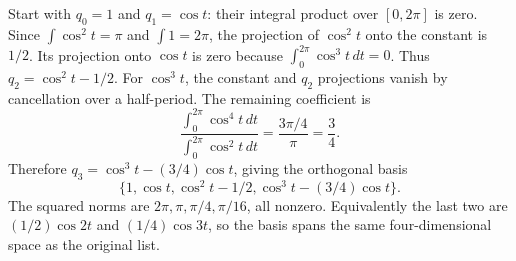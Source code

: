 Start with $q_0=1$ and $q_1=\cos t$: their integral product over
$[0,2\pi]$ is zero. Since $\int\cos^2t=\pi$ and
$\int1=2\pi$, the projection of $\cos^2t$ onto the constant
is $1/2$. Its projection onto $\cos t$ is zero because
$\int_0^{2\pi}\cos^3t\,dt=0$. Thus
$q_2=\cos^2t-1/2$.
For $\cos^3t$, the constant and $q_2$ projections vanish by
cancellation over a half-period. The remaining coefficient is
\[
 \frac{\int_0^{2\pi}\cos^4t\,dt}{\int_0^{2\pi}\cos^2t\,dt}
 =\frac{3\pi/4}{\pi}=\frac34.
\]
Therefore $q_3=\cos^3t-(3/4)\cos t$, giving the orthogonal basis
\[
 \boxed{\{1,\cos t,\cos^2t-1/2,\cos^3t-(3/4)\cos t\}}.
\]
The squared norms are $2\pi,\pi,\pi/4,\pi/16$, all nonzero.
Equivalently the last two are $(1/2)\cos2t$ and $(1/4)\cos3t$,
so the basis spans the same four-dimensional space as the original list.
